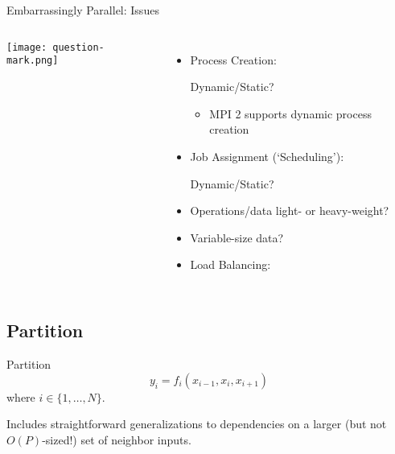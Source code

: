 \documentclass[english,compress]{beamer}
\begin{document}
\begin{frame}{Embarrassingly Parallel: Issues}
  \begin{columns}
      \texttt{[image: question-mark.png]}
      \begin{itemize}
        \item Process Creation:

          Dynamic/Static?
          \begin{itemize}
            \item MPI 2 supports dynamic process creation
          \end{itemize}
        \item Job Assignment (`Scheduling'):

          Dynamic/Static?
        \item Operations/data light- or heavy-weight?
        \item Variable-size data?
        \item Load Balancing:
      \end{itemize}
  \end{columns}
\end{frame}
\subsection{Partition}
\begin{frame}{Partition}
  {\Huge
  \[
    y_i = f_i(x_{i-1}, x_i, x_{i+1})
  \]}
  where $i\in\{1,\dots,N\}$.

  \pause
  \bigskip
  Includes straightforward
  generalizations to dependencies on a larger (but
  not $O(P)$-sized!) set of neighbor inputs.
\end{frame}
\end{document}
